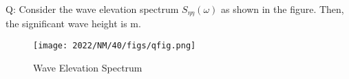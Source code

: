\documentclass[journal,12pt,onecolumn]{IEEEtran}
\theoremstyle{remark}
\begin{document}
\providecommand{\pr}[1]{\ensuremath{\Pr\left(#1\right)}}
\providecommand{\prt}[2]{\ensuremath{p_{#1}^{\left(#2\right)} }}
\providecommand{\qfunc}[1]{\ensuremath{Q\left(#1\right)}}
\providecommand{\sbrak}[1]{\ensuremath{{}\left[#1\right]}}
\providecommand{\lsbrak}[1]{\ensuremath{{}\left[#1\right.}}
\providecommand{\rsbrak}[1]{\ensuremath{{}\left.#1\right]}}
\providecommand{\brak}[1]{\ensuremath{\left(#1\right)}}
\providecommand{\lbrak}[1]{\ensuremath{\left(#1\right.}}
\providecommand{\rbrak}[1]{\ensuremath{\left.#1\right)}}
\providecommand{\cbrak}[1]{\ensuremath{\left\{#1\right\}}}
\providecommand{\lcbrak}[1]{\ensuremath{\left\{#1\right.}}
\providecommand{\rcbrak}[1]{\ensuremath{\left.#1\right\}}}
\newcommand{\sgn}{\mathop{\mathrm{sgn}}}
\providecommand{\abs}[1]{\left\vert#1\right\vert}
\providecommand{\res}[1]{\Res\displaylimits_{#1}} 
\providecommand{\norm}[1]{\left\lVert#1\right\rVert}
\providecommand{\mtx}[1]{\mathbf{#1}}
\providecommand{\mean}[1]{E\left[ #1 \right]}
\providecommand{\cond}[2]{#1\middle|#2}
\providecommand{\fourier}{\overset{\mathcal{F}}{ \rightleftharpoons}}
\newenvironment{amatrix}[1]{%
  \left(\begin{array}{@{}*{#1}{c}|c@{}}
}{%
  \end{array}\right)
}
\newcommand{\solution}{\noindent \textbf{Solution: }}
\newcommand{\cosec}{\,\text{cosec}\,}
\providecommand{\dec}[2]{\ensuremath{\overset{#1}{\underset{#2}{\gtrless}}}}
\newcommand{\myvec}[1]{\ensuremath{\begin{pmatrix}#1\end{pmatrix}}}
\newcommand{\mydet}[1]{\ensuremath{\begin{vmatrix}#1\end{vmatrix}}}
\newcommand{\myaugvec}[2]{\ensuremath{\begin{amatrix}{#1}#2\end{amatrix}}}
\providecommand{\rank}{\text{rank}}
\providecommand{\pr}[1]{\ensuremath{\Pr\left(#1\right)}}
\providecommand{\qfunc}[1]{\ensuremath{Q\left(#1\right)}}
	\newcommand*{\permcomb}[4][0mu]{{{}^{#3}\mkern#1#2_{#4}}}
\newcommand*{\perm}[1][-3mu]{\permcomb[#1]{P}}
\newcommand*{\comb}[1][-1mu]{\permcomb[#1]{C}}
\providecommand{\qfunc}[1]{\ensuremath{Q\left(#1\right)}}
\providecommand{\gauss}[2]{\mathcal{N}\ensuremath{\left(#1,#2\right)}}
\providecommand{\diff}[2]{\ensuremath{\frac{d{#1}}{d{#2}}}}
\providecommand{\myceil}[1]{\left \lceil #1 \right \rceil }
\newcommand\figref{Fig.~\ref}
\newcommand\tabref{Table~\ref}
\newcommand{\sinc}{\,\text{sinc}\,}
\newcommand{\rect}{\,\text{rect}\,}
\let\vec\mathbf

\bigskip
Q: Consider the wave elevation spectrum $S_{\eta \eta}(\omega)$ as shown in the figure. Then, the significant wave height is \underline{\hspace{3cm}} m.
\begin{figure}[H]
    \centering
    \texttt{[image: 2022/NM/40/figs/qfig.png]}
    \caption{Wave Elevation Spectrum}
    \label{fig: GATE22NM40.1}
\end{figure}
\end{document}
